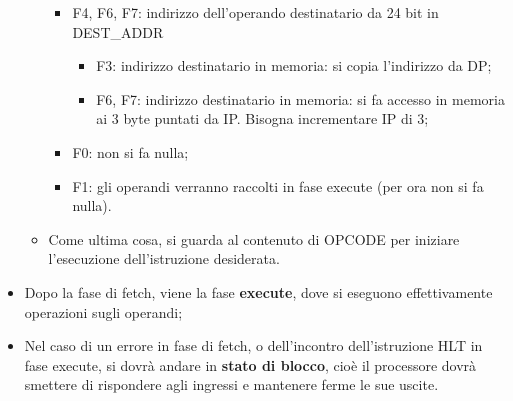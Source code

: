 \documentclass[a4paper,11pt]{article}
\begin{document}
\begin{itemize}
\begin{itemize}
\begin{itemize}
\begin{itemize}
						\end{itemize}
				\item F4, F6, F7: indirizzo dell'operando destinatario da 24 bit in DEST\_ADDR
				\begin{itemize}
					\item F3: indirizzo destinatario in memoria: si copia l'indirizzo da DP;
					\item F6, F7: indirizzo destinatario in memoria: si fa accesso in memoria ai 3 byte puntati da IP. Bisogna incrementare IP di 3; 
				\end{itemize}
			\item F0: non si fa nulla;
			\item F1: gli operandi verranno raccolti in fase execute (per ora non si fa nulla).
				\end{itemize}
			\item Come ultima cosa, si guarda al contenuto di OPCODE per iniziare l'esecuzione dell'istruzione desiderata.
		\end{itemize}
	\item Dopo la fase di fetch, viene la fase \textbf{execute}, dove si eseguono effettivamente operazioni sugli operandi;

	\item Nel caso di un errore in fase di fetch, o dell'incontro dell'istruzione HLT in fase execute, si dovrà andare in \textbf{stato di blocco}, cioè il processore dovrà smettere di rispondere agli ingressi e mantenere ferme le sue uscite.
\end{itemize}
\end{document}
